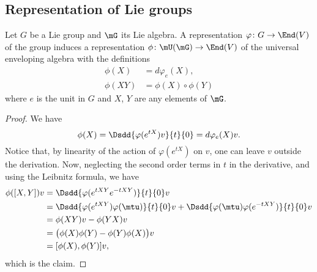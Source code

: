                     \subsection{Representation of Lie groups}

\begin{proposition}
    Let $G$ be a Lie group and $\mG$ its Lie algebra. A representation $\varphi\colon G\to \End(V)$ of the group induces a representation $\phi\colon \mU(\mG)\to \End(V)$ of the universal enveloping algebra with the definitions
    \begin{subequations}
        \begin{align}
            \phi(X)     &=d\varphi_e(X),\\
            \phi(XY)    &=\phi(X)\circ\phi(Y)
        \end{align}
    \end{subequations}
    where $e$ is the unit in $G$ and $X$, $Y$ are any elements of $\mG$.
\end{proposition}

\begin{proof}
    We have
    \begin{equation}
        \phi(X)=\Dsdd{ \varphi( e^{tX})v }{t}{0}=d\varphi_e(X)v.
    \end{equation}
    Notice that, by linearity of the action of $\varphi( e^{tX})$ on $v$, one can leave $v$ outside the derivation. Now, neglecting the second order terms in $t$ in the derivative, and using the Leibnitz formula, we have
    \begin{equation}
        \begin{aligned}[]
            \phi([X,Y])v    &=  \Dsdd{ \varphi( e^{tXY} e^{-tXY}) }{t}{0}v\\
                    &=  \Dsdd{ \varphi( e^{tXY})\varphi(\mtu) }{t}{0}v+\Dsdd{ \varphi(\mtu)\varphi( e^{-tXY}) }{t}{0}v\\
                    &=  \phi(XY)v-\phi(YX)v\\
                    &=  \big( \phi(X)\phi(Y)-\phi(Y)\phi(X) \big)v\\
                    &=  [\phi(X),\phi(Y)]v,
        \end{aligned}
    \end{equation}
    which is the claim.
\end{proof}

